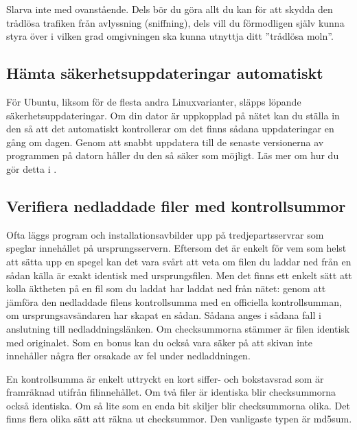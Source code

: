 \documentclass[a4paper,final]{memoir} %
\begin{document}
Slarva inte med ovanstående. Dels bör du göra allt du kan för att skydda den trådlösa trafiken från avlyssning (sniffning), dels vill du förmodligen själv kunna styra över i vilken grad omgivningen ska kunna utnyttja ditt ''trådlösa moln''.


\subsection{Hämta säkerhetsuppdateringar automatiskt}


För Ubuntu, liksom för de flesta andra Linuxvarianter, släpps löpande säkerhetsuppdateringar. Om din dator är uppkopplad på nätet kan du ställa in den så att det automatiskt kontrollerar om det finns sådana uppdateringar en gång om dagen. Genom att snabbt uppdatera till de senaste versionerna av programmen på datorn håller du den så säker som möjligt. Läs mer om hur du gör detta i .


\subsection{Verifiera nedladdade filer med kontrollsummor}\label{sec:checksummor}


Ofta läggs program och installationsavbilder upp på tredjepartsservrar som speglar innehållet på ursprungsservern. Eftersom det är enkelt för vem som helst att sätta upp en spegel kan det vara svårt att veta om filen du laddar ned från en sådan källa är exakt identisk med ursprungsfilen. Men det finns ett enkelt sätt att kolla äktheten på en fil som du laddat har laddat ned från nätet: genom att jämföra den nedladdade filens kontrollsumma med en officiella kontrollsumman, om ursprungsavsändaren har skapat en sådan. Sådana anges i sådana fall i anslutning till nedladdningslänken. Om checksummorna stämmer är filen identisk med originalet. Som en bonus kan du också vara säker på att skivan inte innehåller några fler orsakade av fel under nedladdningen.

En kontrollsumma är enkelt uttryckt en kort siffer- och bokstavsrad som är framräknad utifrån filinnehållet. Om två filer är identiska blir checksummorna också identiska. Om så lite som en enda bit skiljer blir checksummorna olika. Det finns flera olika sätt att räkna ut checksummor. Den vanligaste typen är md5sum.
\end{document}
